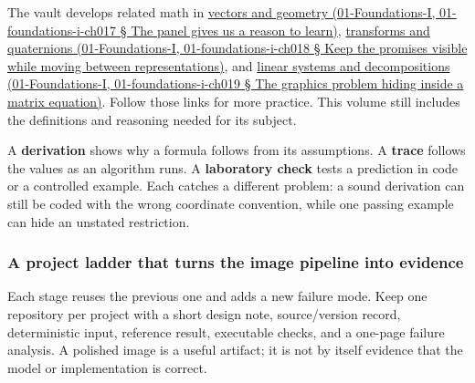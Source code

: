 The vault develops related math in \href{}{vectors and geometry (01-Foundations-I, 01-foundations-i-ch017 § The panel gives us a reason to learn)}, \href{}{transforms and quaternions (01-Foundations-I, 01-foundations-i-ch018 § Keep the promises visible while moving between representations)}, and \href{}{linear systems and decompositions (01-Foundations-I, 01-foundations-i-ch019 § The graphics problem hiding inside a matrix equation)}. Follow those links for more practice. This volume still includes the definitions and reasoning needed for its subject.

A \textbf{derivation} shows why a formula follows from its assumptions. A \textbf{trace} follows the values as an algorithm runs. A \textbf{laboratory check} tests a prediction in code or a controlled example. Each catches a different problem: a sound derivation can still be coded with the wrong coordinate convention, while one passing example can hide an unstated restriction.

\subsubsection{A project ladder that turns the image pipeline into evidence}\label{a-project-ladder-that-turns-the-image-pipeline-into-evidence}

Each stage reuses the previous one and adds a new failure mode. Keep one repository per project with a short design note, source/version record, deterministic input, reference result, executable checks, and a one-page failure analysis. A polished image is a useful artifact; it is not by itself evidence that the model or implementation is correct.

